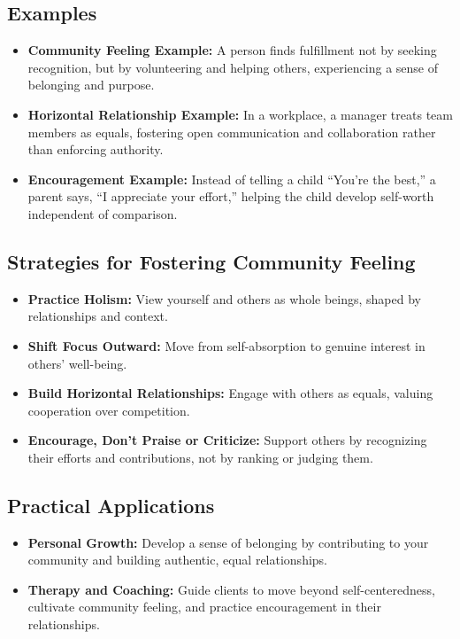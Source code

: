 \subsection*{Examples}
\begin{itemize}
    \item \textbf{Community Feeling Example:} A person finds fulfillment not by seeking recognition, but by volunteering and helping others, experiencing a sense of belonging and purpose.
    \item \textbf{Horizontal Relationship Example:} In a workplace, a manager treats team members as equals, fostering open communication and collaboration rather than enforcing authority.
    \item \textbf{Encouragement Example:} Instead of telling a child “You’re the best,” a parent says, “I appreciate your effort,” helping the child develop self-worth independent of comparison.
\end{itemize}

\subsection*{Strategies for Fostering Community Feeling}
\begin{itemize}
    \item \textbf{Practice Holism:} View yourself and others as whole beings, shaped by relationships and context.
    \item \textbf{Shift Focus Outward:} Move from self-absorption to genuine interest in others’ well-being.
    \item \textbf{Build Horizontal Relationships:} Engage with others as equals, valuing cooperation over competition.
    \item \textbf{Encourage, Don’t Praise or Criticize:} Support others by recognizing their efforts and contributions, not by ranking or judging them.
\end{itemize}

\subsection*{Practical Applications}
\begin{itemize}
    \item \textbf{Personal Growth:} Develop a sense of belonging by contributing to your community and building authentic, equal relationships.
    \item \textbf{Therapy and Coaching:} Guide clients to move beyond self-centeredness, cultivate community feeling, and practice encouragement in their relationships.
\end{itemize}